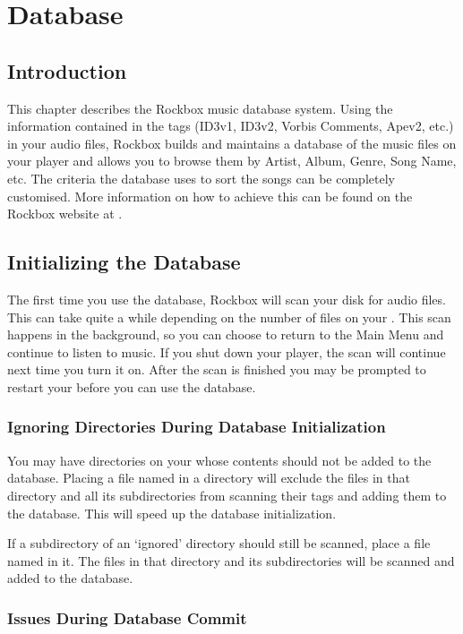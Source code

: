 \section{\label{ref:database}Database}

\subsection{Introduction}
This chapter describes the Rockbox music database system. Using the information
contained in the tags (ID3v1, ID3v2, Vorbis Comments, Apev2, etc.) in your
audio files, Rockbox builds and maintains a database of the music
files on your player and allows you to browse them by Artist, Album, Genre, 
Song Name, etc.  The criteria the database uses to sort the songs can be completely
 customised. More information on how to achieve this can be found on the Rockbox
 website at . 

\subsection{Initializing the Database}
The first time you use the database, Rockbox will scan your disk for audio files.
This can take quite a while depending on the number of files on your \dap{}.
This scan happens in the background, so you can choose to return to the
Main Menu and continue to listen to music.
If you shut down your player, the scan will continue next time you turn it on.
After the scan is finished you may be prompted to restart your \dap{} before
you can use the database.

\subsubsection{Ignoring Directories During Database Initialization}

You may have directories on your \dap{} whose contents should not be added
to the database. Placing a file named  in a directory
will exclude the files in that directory and all its subdirectories from
scanning their tags and adding them to the database. This will speed up the
database initialization.

If a subdirectory of an `ignored' directory should still be scanned, place a
file named  in it. The files in that directory and
its subdirectories will be scanned and added to the database.

\subsubsection{Issues During Database Commit}

